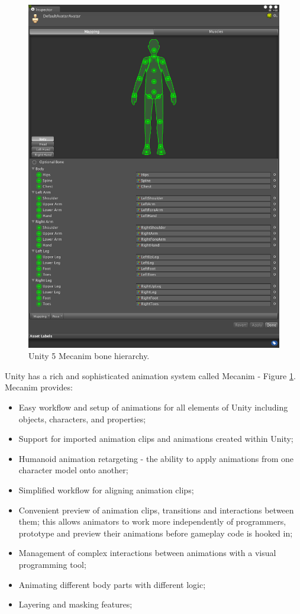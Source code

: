 \documentclass[a4paper, 12pt]{amsart}
\begin{document}
\begin{figure}[htb]
\centering
\includegraphics[width=.9\linewidth]{fig_mecanim_hierarchy}
\caption{Unity 5 Mecanim bone hierarchy.}
\label{fig:mecanim_hierarchy}
\end{figure}

Unity has a rich and sophisticated animation system called Mecanim - Figure \ref{fig:mecanim_hierarchy}. Mecanim provides:

\begin{itemize}
\item Easy workflow and setup of animations for all elements of Unity including objects, characters, and properties;
\item Support for imported animation clips and animations created within Unity;
\item Humanoid animation retargeting - the ability to apply animations from one character model onto another;
\item Simplified workflow for aligning animation clips;
\item Convenient preview of animation clips, transitions and interactions between them; this allows animators to work more independently of programmers, prototype and preview their animations before gameplay code is hooked in;
\item Management of complex interactions between animations with a visual programming tool;
\item Animating different body parts with different logic;
\item Layering and masking features;
\end{itemize}
\end{document}
